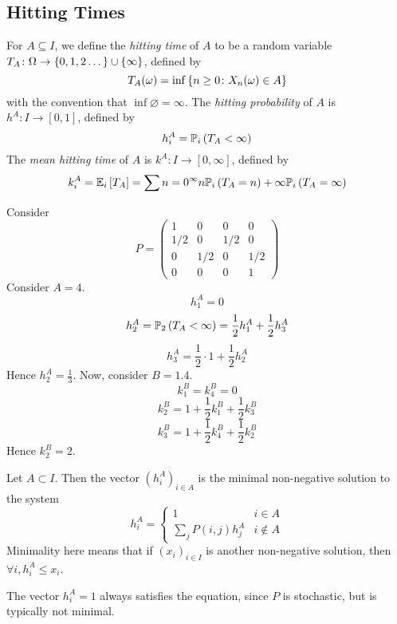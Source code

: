 \subsection{Hitting Times}
\begin{definition}
For \( A \subseteq I \), we define the \textit{hitting time} of \( A \) to be a random variable \( T_A \colon \Omega \to \qty{0,1,2\dots} \cup \{ \infty \} \), defined by
\[ T_A(\omega) = \inf \qty{n \geq 0 \colon X_n(\omega) \in A} \]
with the convention that \( \inf \varnothing = \infty \).
The \textit{hitting probability} of \( A \) is \( h^A \colon I \to [0,1] \), defined by
\[ h_i^A = \mathbb{P}_{i}\left({T_A < \infty}\right) \]
The \textit{mean hitting time} of \( A \) is \( k^A \colon I \to [0,\infty] \), defined by
\[ k_i^A = \mathbb{E}_{i}\left[{T_A}\right] = \sum{n=0}^\infty n \mathbb{P}_{i}\left({T_A = n}\right) + \infty \mathbb{P}_{i}\left({T_A = \infty}\right) \]
\end{definition}
\begin{example}
Consider
\[ P = \begin{pmatrix}
1 & 0 & 0 & 0 \\
1/2 & 0 & 1/2 & 0 \\
0 & 1/2 & 0 & 1/2 \\
0 & 0 & 0 & 1
\end{pmatrix} \]
Consider \( A = \qty{4} \).
\[ h_1^A = 0 \]
\[ h_2^A = \mathbb{P}_{2}\left({T_A < \infty}\right) = \frac{1}{2} h_1^A + \frac{1}{2} h_3^A \]
\[ h_3^A = \frac{1}{2} \cdot 1 + \frac{1}{2} h_2^A \]
Hence \( h_2^A = \frac{1}{3} \).
Now, consider \( B = \qty{1,4} \).
\[ k_1^B = k_4^B = 0 \]
\[ k_2^B = 1 + \frac{1}{2} k_1^B + \frac{1}{2} k_3^B \]
\[ k_3^B = 1 + \frac{1}{2} k_4^B + \frac{1}{2} k_2^B \]
Hence \( k_2^B = 2 \).
\end{example}
\begin{theorem}
Let \( A \subset I \).
Then the vector \( (h_i^A)_{i \in A} \) is the minimal non-negative solution to the system
\[ h_i^A = \begin{cases}
1 & i \in A \\
\sum_j P(i,j) h_j^A & i \not\in A \end{cases} \]
Minimality here means that if \( (x_i)_{i \in I} \) is another non-negative solution, then \( \forall i, h_i^A \leq x_i \).
\end{theorem}
\begin{note}
The vector \( h_i^A = 1 \) always satisfies the equation, since \( P \) is stochastic, but is typically not minimal.
\end{note}
